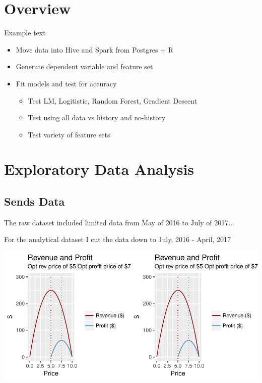 \documentclass{report}\usepackage[]{graphicx}\usepackage[]{color}
\makeatletter
\def\maxwidth{ %
  \ifdim\Gin@nat@width>\linewidth
    \linewidth
  \else
    \Gin@nat@width
  \fi
}
\newenvironment{kframe}{%
 \def\at@end@of@kframe{}%
 \ifinner\ifhmode%
  \def\at@end@of@kframe{\end{minipage}}%
  \begin{minipage}{\columnwidth}%
 \fi\fi%
 \def\FrameCommand##1{\hskip\@totalleftmargin \hskip-\fboxsep
 \colorbox{shadecolor}{##1}\hskip-\fboxsep
     \hskip-\linewidth \hskip-\@totalleftmargin \hskip\columnwidth}%
 \MakeFramed {\advance\hsize-\width
   \@totalleftmargin\z@ \linewidth\hsize
   \@setminipage}}%
 {\par\unskip\endMakeFramed%
 \at@end@of@kframe}
\makeatother
\begin{document}

\tableofcontents
\newpage


\section{Overview}
Example text
\begin{itemize}
  \item Move data into Hive and Spark from Postgres + R 
  \item Generate dependent variable and feature set 
  \item Fit models and test for accuracy
  \begin{itemize}
  \item Test LM, Logitistic, Random Forest, Gradient Descent 
  \item Test using all data vs history and no-history
  \item Test variety of feature sets
  \end{itemize}
\end{itemize}

\newpage 

\section{Exploratory Data Analysis}


\subsection{Sends Data}
The raw dataset included limited data from May of 2016 to July of 2017...
\begin{kframe}


{\ttfamily\noindent\color{warningcolor}{\#\# Warning: Removed 20 rows containing missing values (geom\_path).}}\end{kframe}


For the analytical dataset I cut the data down to July, 2016 - April, 2017

\begin{kframe}


{\ttfamily\noindent\color{warningcolor}{\#\# Warning: Removed 20 rows containing missing values (geom\_path).}}

{\ttfamily\noindent\color{warningcolor}{\#\# Warning: Removed 20 rows containing missing values (geom\_path).}}\end{kframe}
\includegraphics[width=\maxwidth]{figure/unnamed-chunk-2-1} 
\end{document}
